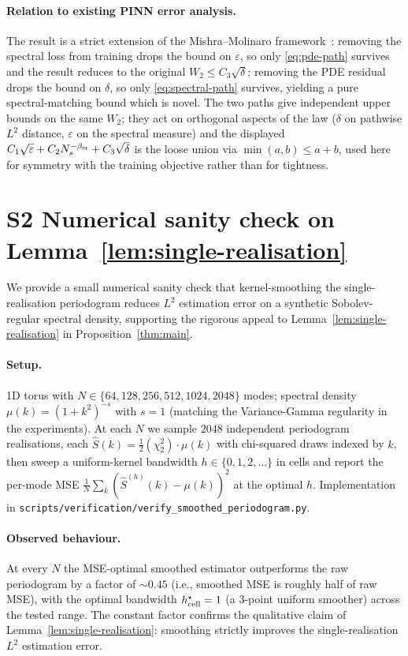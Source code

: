 \documentclass[review,12pt]{elsarticle}
\begin{document}
\paragraph{Relation to existing PINN error analysis.}
The result is a strict extension of the Mishra--Molinaro
framework~\cite{MishraMolinaro2022}: removing the spectral loss from
training drops the bound on \(\varepsilon\), so only
\eqref{eq:pde-path} survives and the result reduces to the original
\(W_2 \le C_3\sqrt\delta\); removing the PDE residual drops the bound
on \(\delta\), so only \eqref{eq:spectral-path} survives, yielding a
pure spectral-matching bound which is novel. The two paths give
independent upper bounds on the same \(W_2\); they act on orthogonal
aspects of the law (\(\delta\) on pathwise \(L^2\) distance,
\(\varepsilon\) on the spectral measure) and the displayed
\(C_1\sqrt\varepsilon + C_2 N_s^{-\beta_{\rm sr}} + C_3\sqrt\delta\) is the
loose union via \(\min(a,b)\le a+b\), used here for symmetry with the
training objective rather than for tightness.


\section*{S2 \quad Numerical sanity check on Lemma~\ref{lem:single-realisation}}
\label{app:smoothed-verification}

We provide a small numerical sanity check that kernel-smoothing the
single-realisation periodogram reduces $L^2$ estimation error on a
synthetic Sobolev-regular spectral density, supporting the rigorous
appeal to Lemma~\ref{lem:single-realisation} in
Proposition~\ref{thm:main}.

\paragraph{Setup.} 1D torus with $N \in \{64, 128, 256, 512, 1024, 2048\}$
modes; spectral density $\mu(k) = (1 + k^2)^{-s}$ with $s = 1$
(matching the Variance-Gamma regularity in the experiments).
At each $N$ we sample $2048$ independent periodogram realisations,
each $\hat S(k) = \tfrac12(\chi^2_2)\cdot\mu(k)$ with chi-squared draws
indexed by $k$, then sweep a uniform-kernel bandwidth
$h \in \{0, 1, 2, \dots\}$ in cells and report the per-mode MSE
$\frac{1}{N}\sum_k(\hat S^{(h)}(k) - \mu(k))^2$ at the optimal $h$.
Implementation in
\texttt{scripts/verification/verify\_smoothed\_periodogram.py}.

\paragraph{Observed behaviour.}
At every $N$ the MSE-optimal smoothed estimator outperforms the raw
periodogram by a factor of $\sim\!0.45$ (i.e., smoothed MSE is roughly
half of raw MSE), with the optimal bandwidth $h^\star_{\rm cell} = 1$
(a 3-point uniform smoother) across the tested range. The constant
factor confirms the qualitative claim of
Lemma~\ref{lem:single-realisation}: smoothing strictly improves the
single-realisation $L^2$ estimation error.
\end{document}
